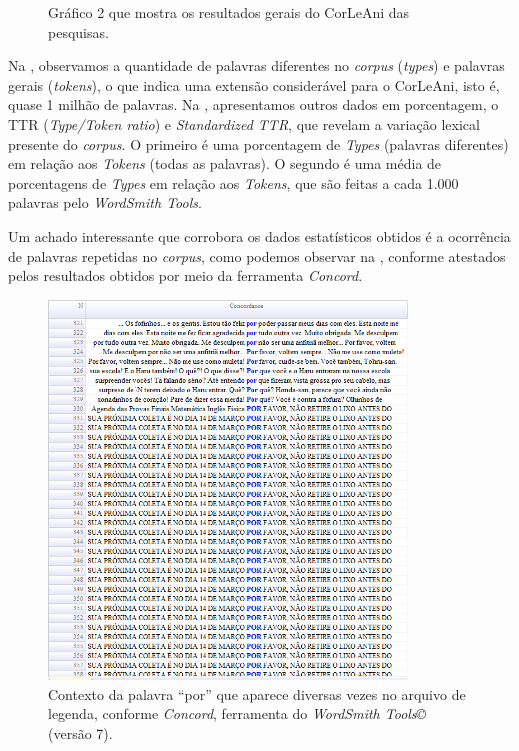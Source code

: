 \documentclass[portuguese]{textolivre}
\begin{document}
\begin{figure}[htbp]
\begin{minipage}{0.45\textwidth}
 \caption{Gráfico 2 que mostra os resultados gerais do CorLeAni das pesquisas.}
 \label{fig35}
 \end{minipage}%
\end{figure}

Na , observamos a quantidade de palavras diferentes no \textit{corpus} (\textit{types}) e palavras gerais (\textit{tokens}), o que indica uma extensão considerável para o CorLeAni, isto é, quase 1 milhão de palavras. Na , apresentamos outros dados em porcentagem, o TTR (\textit{Type/Token ratio}) e \textit{Standardized TTR}, que revelam a variação lexical presente do \textit{corpus}. O primeiro é uma porcentagem de \textit{Types} (palavras diferentes) em relação aos \textit{Tokens} (todas as palavras). O segundo é uma média de porcentagens de \textit{Types} em relação aos \textit{Tokens}, que são feitas a cada 1.000 palavras pelo \textit{WordSmith Tools}.

Um achado interessante que corrobora os dados estatísticos obtidos é a ocorrência de palavras repetidas no \textit{corpus}, como podemos observar na , conforme atestados pelos resultados obtidos por meio da ferramenta \textit{Concord}. 

\begin{figure}[htbp]
 \centering
 \includegraphics[width=0.85\textwidth]{Fig35.png}
 \caption{Contexto da palavra “por” que aparece diversas vezes no arquivo de legenda, conforme \textit{Concord}, ferramenta do \textit{WordSmith Tools©} (versão 7).}
 \label{fig36}
\end{figure}
\end{document}
